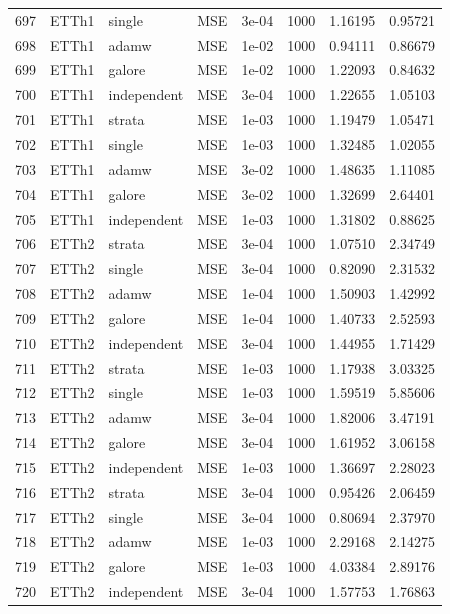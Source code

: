 \begin{longtable}{rlllrrrr}
697 & ETTh1 & single & MSE & 3e-04 & 1000 & 1.16195 & 0.95721 \\
698 & ETTh1 & adamw & MSE & 1e-02 & 1000 & 0.94111 & 0.86679 \\
699 & ETTh1 & galore & MSE & 1e-02 & 1000 & 1.22093 & 0.84632 \\
700 & ETTh1 & independent & MSE & 3e-04 & 1000 & 1.22655 & 1.05103 \\
\rowcolor{oursbg}
701 & ETTh1 & strata & MSE & 1e-03 & 1000 & 1.19479 & 1.05471 \\
702 & ETTh1 & single & MSE & 1e-03 & 1000 & 1.32485 & 1.02055 \\
703 & ETTh1 & adamw & MSE & 3e-02 & 1000 & 1.48635 & 1.11085 \\
704 & ETTh1 & galore & MSE & 3e-02 & 1000 & 1.32699 & 2.64401 \\
705 & ETTh1 & independent & MSE & 1e-03 & 1000 & 1.31802 & 0.88625 \\
\rowcolor{oursbg}
706 & ETTh2 & strata & MSE & 3e-04 & 1000 & 1.07510 & 2.34749 \\
707 & ETTh2 & single & MSE & 3e-04 & 1000 & 0.82090 & 2.31532 \\
708 & ETTh2 & adamw & MSE & 1e-04 & 1000 & 1.50903 & 1.42992 \\
709 & ETTh2 & galore & MSE & 1e-04 & 1000 & 1.40733 & 2.52593 \\
710 & ETTh2 & independent & MSE & 3e-04 & 1000 & 1.44955 & 1.71429 \\
\rowcolor{oursbg}
711 & ETTh2 & strata & MSE & 1e-03 & 1000 & 1.17938 & 3.03325 \\
712 & ETTh2 & single & MSE & 1e-03 & 1000 & 1.59519 & 5.85606 \\
713 & ETTh2 & adamw & MSE & 3e-04 & 1000 & 1.82006 & 3.47191 \\
714 & ETTh2 & galore & MSE & 3e-04 & 1000 & 1.61952 & 3.06158 \\
715 & ETTh2 & independent & MSE & 1e-03 & 1000 & 1.36697 & 2.28023 \\
\rowcolor{oursbg}
716 & ETTh2 & strata & MSE & 3e-04 & 1000 & 0.95426 & 2.06459 \\
717 & ETTh2 & single & MSE & 3e-04 & 1000 & 0.80694 & 2.37970 \\
718 & ETTh2 & adamw & MSE & 1e-03 & 1000 & 2.29168 & 2.14275 \\
719 & ETTh2 & galore & MSE & 1e-03 & 1000 & 4.03384 & 2.89176 \\
720 & ETTh2 & independent & MSE & 3e-04 & 1000 & 1.57753 & 1.76863 \\

\end{longtable}
